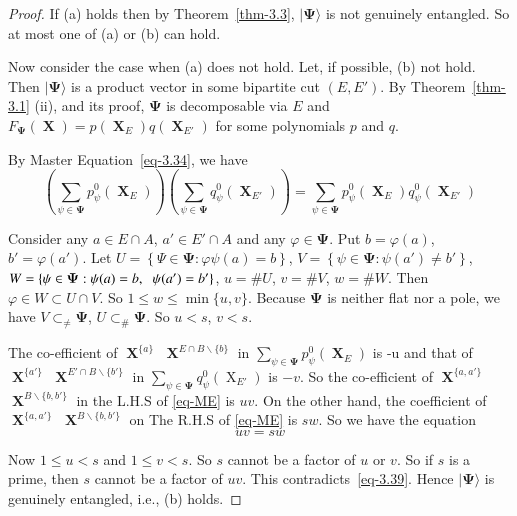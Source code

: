 \documentclass[a4paper,12pt]{article}
\DeclareMathOperator{\x}{\mathrm{X}}
\theoremstyle{definition}
\theoremstyle{underlinethm}
\theoremstyle{definition}
\begin{document}
\begin{proof}
If (a) holds then by Theorem~\eqref{thm-3.3}, $| \boldsymbol{\Psi} \rangle$ is not genuinely entangled. So at most one of (a) or (b) can hold.

Now consider the case when (a) does not hold. Let, if possible, (b) not hold. Then $|\boldsymbol{\Psi} \rangle$ is a product vector in some bipartite cut $(E, E')$. By Theorem~\eqref{thm-3.1} (ii), and its proof, $\boldsymbol{\Psi}$ is decomposable via $E$ and $F_{\boldsymbol{\Psi}}(\boldsymbol{\x}) = p(\boldsymbol{\x}_{E}) q (\boldsymbol{\x}_{E'})$ for some polynomials $p$ and $q$.

By Master Equation~\eqref{eq-3.34}, we have
\begin{equation}
\left(\sum_{\psi \in \boldsymbol{\Psi}} p_{\psi}^{0}(\boldsymbol{\x}_{E})\right) \left(\sum_{\psi \in \boldsymbol{\Psi}} q_{\psi}^{0} (\boldsymbol{\x}_{E'}) \right) = \sum_{\psi \in \boldsymbol{\Psi}} p_{\psi}^{0}(\boldsymbol{\x}_{E}) q_{\psi}^{0}(\boldsymbol{\x}_{E'})\tag{ME}\label{eq-ME}
\end{equation}
 
Consider any $a \in E \cap A$, $a' \in E' \cap A$ and any $\varphi \in \boldsymbol{\Psi}$. Put $b = \varphi(a)$, $b' = \varphi(a')$. Let $U = \left\{\Psi \in \boldsymbol{\Psi} : \varphi \psi(a) = b \right\}$, $V= \left\{\psi \in \boldsymbol{\Psi} : \psi(a') \neq b' \right\}$, $W = \left\{\psi \in \boldsymbol{\Psi} : \psi(a) = b,\right.\\ \left.\psi(a') = b'\right\}$,  $u =\# U$, $v = \# V$, $w = \# W$. Then $\varphi \in W \subset U \cap V$. So $1 \leq w \leq \min \{u, v\}$. Because $\boldsymbol{\Psi}$ is neither flat nor a pole, we have $V \subset_{\neq} \boldsymbol{\Psi}$, $U \subset_{\#} \boldsymbol{\Psi}$. So $u < s$, $v < s$.
 
The co-efficient of $\boldsymbol{\x}^{\{a\}}$ $\boldsymbol{\x}^{E \cap B \smallsetminus \{b\}}$ in $\sum_{\psi \in \boldsymbol{\Psi}} p_{\psi}^{0}(\boldsymbol{\x}_{E})$ is -u and that of $\boldsymbol{\x}^{\{a'\}}$ $\boldsymbol{\x}^{E' \cap B \smallsetminus \{b'\}}$ in $\sum_{\psi \in \boldsymbol{\Psi}} q_{\psi}^{0}(\x_{E'})$ is $-v$. So the co-efficient of $\boldsymbol{\x}^{\{a, a'\}}$ $\boldsymbol{\x}^{B \smallsetminus \{b, b'\}}$ in the L.H.S of \eqref{eq-ME} is $uv$. On the other hand, the coefficient of $\boldsymbol{\x}^{\{a, a'\}}$ $\boldsymbol{\x}^{B \smallsetminus \{b, b'\}}$ on  The R.H.S of \eqref{eq-ME} is $sw$. So we have the equation 
\begin{equation}
uv=sw \tag{3.39}\label{eq-3.39}
\end{equation}

Now $1 \leq u < s$ and $1 \leq v < s$. So $s$ cannot be a factor of $u$ or $v$. So if $s$ is a prime, then $s$ cannot be a factor of $uv$. This contradicts~\eqref{eq-3.39}. Hence $| \boldsymbol{\Psi} \rangle$ is genuinely entangled, i.e., (b) holds.
 
\end{proof}
\end{document}
